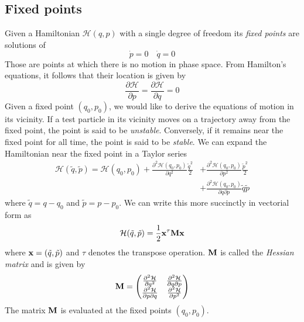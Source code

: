 \subsection{Fixed points}
Given a Hamiltonian $\mathcal{H}(q,p)$ with a single degree of freedom
its \emph{fixed points} are solutions of
\begin{equation}
    \dot{p}=0\quad\dot{q}=0
\end{equation}
Those are points at which there is no motion in phase space. From 
Hamilton's equations, it follows that their location is given by
\begin{equation}
   \frac{\partial \mathcal{H}}{\partial p}= \frac{\partial \mathcal{H}}{\partial q}=0
\end{equation}
Given a fixed point $(q_0,p_0)$, we would like to derive the equations
of motion in its vicinity. If a test particle in its vicinity moves 
on a trajectory away from the fixed point, the point is said to be
\emph{unstable}. Conversely, if it remains near the fixed point for all 
time, the point is said to be \emph{stable}. We can expand the Hamiltonian
near the fixed point in a Taylor series
\begin{align}
    \mathcal{H}(\tilde q, \tilde p)=\mathcal{H}(q_0,p_0) 
    + \frac{\partial^2\mathcal{H}(q_0,p_0)}{\partial q^2} \frac{\tilde q^2}{2} 
    &+\frac{\partial^2\mathcal{H}(q_0,p_0)}{\partial p^2} \frac{\tilde p^2}{2} \nonumber\\
    &+\frac{\partial^2\mathcal{H}(q_0,p_0)}{\partial q\partial p}\tilde q\tilde p 
\end{align}
where $\tilde q=q-q_0$ and $\tilde p=p-p_0$. We can write this more succinctly 
in vectorial form as
\begin{equation}
    \mathcal{H}(\tilde q,\tilde p)= \frac{1}{2} \boldsymbol{\mathbf{x}}^\tau\boldsymbol{\mathbf{M}}\boldsymbol{\mathbf{x}}
\end{equation}
where $\boldsymbol{\mathbf{x}}=(\tilde q, \tilde p)$ and $\tau$ denotes the transpose 
operation. $\boldsymbol{\mathbf{M}}$ is called the \emph{Hessian matrix} and is given by
\begin{equation}
    \boldsymbol{\mathbf{M}}=
    \begin{pmatrix}
        \frac{\partial^2 \mathcal{H}}{\partial q^2} &
        \frac{\partial^2 \mathcal{H}}{\partial q\partial p }\\
        \frac{\partial^2 \mathcal{H}}{\partial p \partial q} &
        \frac{\partial^2 \mathcal{H}}{\partial p^2} 
    \end{pmatrix}
\end{equation}
The matrix $\boldsymbol{\mathbf{M}}$ is evaluated at the fixed points $(q_0,p_0)$.
